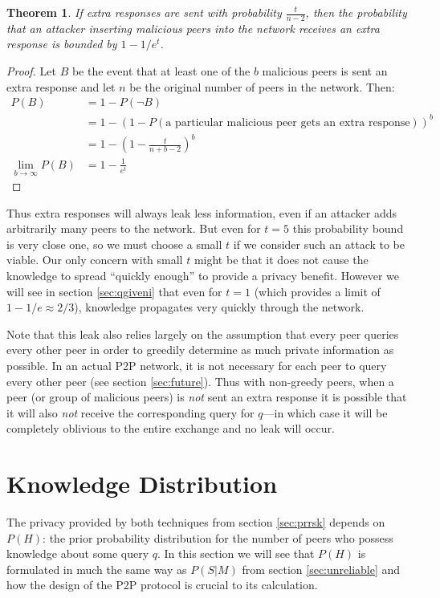 \documentclass{article}
\newcommand{\secref}[1]{section \ref{sec:#1}}
\newtheorem{theorem}{Theorem}
\begin{document}
\begin{theorem}
	If extra responses are sent with probability $\frac{t}{n-2}$, then the
	probability that an attacker inserting malicious peers into the network
	receives an extra response is bounded by $1-1/e^t$.
\end{theorem}
\begin{proof}
Let $B$ be the event that at least one of the $b$ malicious peers is sent an extra
	response and let $n$ be the original number of peers in the network. Then:
\begin{align*}
	P(B)&=1-P(\neg B)\\
	&=1-\left(1-P(\text{a particular malicious peer gets an extra response})\right)^b\\
	&=1-\left(1-\frac{t}{n+b-2}\right)^b\\
	\lim_{b\rightarrow\infty}P(B)&=1-\frac{1}{e^t}
\end{align*}
\end{proof}

Thus extra responses will always leak less information, even if an attacker adds
arbitrarily many peers to the network. But even for $t=5$ this probability bound
is very close one, so we must choose a small $t$ if we consider such an attack
to be viable.  Our only concern with small $t$ might be that it does not cause
the knowledge to spread ``quickly enough'' to provide a privacy benefit. However
we will see in \secref{qgiveni} that even for $t=1$ (which provides a limit of
$1-1/e\approx2/3$), knowledge propagates very quickly through the network.

Note that this leak also relies largely on the assumption that every peer
queries every other peer in order to greedily determine as much private
information as possible. In an actual P2P network, it is not necessary for each
peer to query every other peer (see \secref{future}). Thus with non-greedy peers, when a peer (or
group of malicious peers) is
{\it not} sent an extra response it is possible that it will also {\it not} receive the
corresponding query for $q$---in which case it will be completely oblivious to the
entire exchange and no leak will occur.

\section{Knowledge Distribution}\label{sec:kdist}

The privacy provided by both techniques from \secref{prrsk} depends on $P(H)$:
the prior probability distribution for the number of peers who possess knowledge
about some query $q$. In this section we will see that $P(H)$ is formulated in
much the same way as $P(S|M)$ from \secref{unreliable} and how the design of the
P2P protocol is crucial to its calculation.
\end{document}
